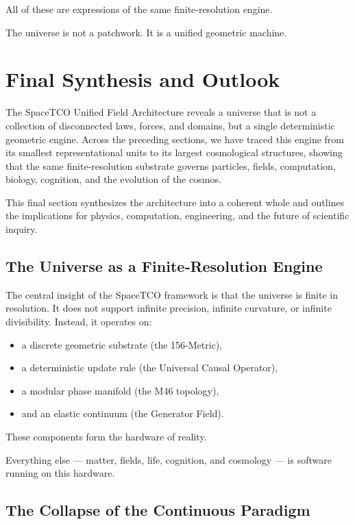 \documentclass[reprint,amsmath,amssymb,aps,prl,floatfix]{revtex4-2}
\begin{document}
\begin{itemize}
All of these are expressions of the same finite‑resolution engine.
\medskip

The universe is not a patchwork.  
It is a unified geometric machine.

\section{Final Synthesis and Outlook}

The SpaceTCO Unified Field Architecture reveals a universe that is not a collection of disconnected laws, forces, and domains, but a single deterministic geometric engine. Across the preceding sections, we have traced this engine from its smallest representational units to its largest cosmological structures, showing that the same finite‑resolution substrate governs particles, fields, computation, biology, cognition, and the evolution of the cosmos.
\medskip

This final section synthesizes the architecture into a coherent whole and outlines the implications for physics, computation, engineering, and the future of scientific inquiry.

\subsection{The Universe as a Finite‑Resolution Engine}

The central insight of the SpaceTCO framework is that the universe is finite in resolution. It does not support infinite precision, infinite curvature, or infinite divisibility. Instead, it operates on:
\begin{itemize}
\item a discrete geometric substrate (the 156‑Metric),  
\item a deterministic update rule (the Universal Causal Operator),  
\item a modular phase manifold (the M46 topology),  
\item and an elastic continuum (the Generator Field).
\end{itemize}
\medskip

These components form the hardware of reality.
\medskip

Everything else — matter, fields, life, cognition, and cosmology — is software running on this hardware.

\subsection{The Collapse of the Continuous Paradigm}


\end{itemize}
\end{document}
